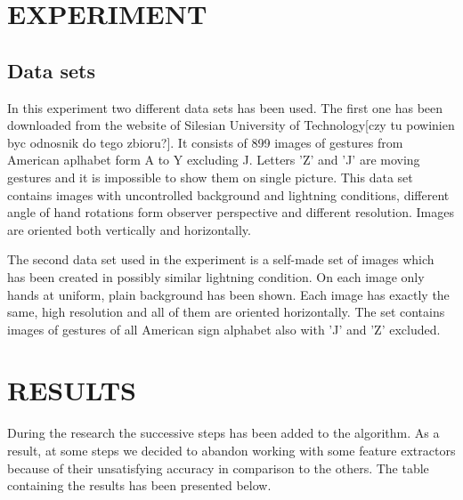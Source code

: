 \documentclass[11pt,a4paper]{article}
\begin{document}
\section{EXPERIMENT}

\subsection{Data sets}
	In this experiment two different data sets has been used. The first one has been downloaded from the website of Silesian University of Technology[czy tu powinien byc odnosnik do tego zbioru?]. It consists of 899 images of gestures from American aplhabet form A to Y excluding J. Letters 'Z' and 'J' are moving gestures and it is impossible to show them on single picture. This data set contains images with uncontrolled background and lightning conditions, different angle of hand rotations form observer perspective and different resolution. Images are oriented both vertically and horizontally.
	
	The second data set used in the experiment is a self-made set of images which has been created in possibly similar lightning condition. On each image only hands at uniform, plain background has been shown. Each image has exactly the same, high resolution and all of them are oriented horizontally. The set contains images of gestures of all American sign alphabet also with 'J' and 'Z' excluded.



\section{RESULTS}

During the research the successive steps has been added to the algorithm. As a result, at some steps we decided to abandon working with some feature extractors because of their unsatisfying accuracy in comparison to the others. The table containing the results has been presented below.
\end{document}
